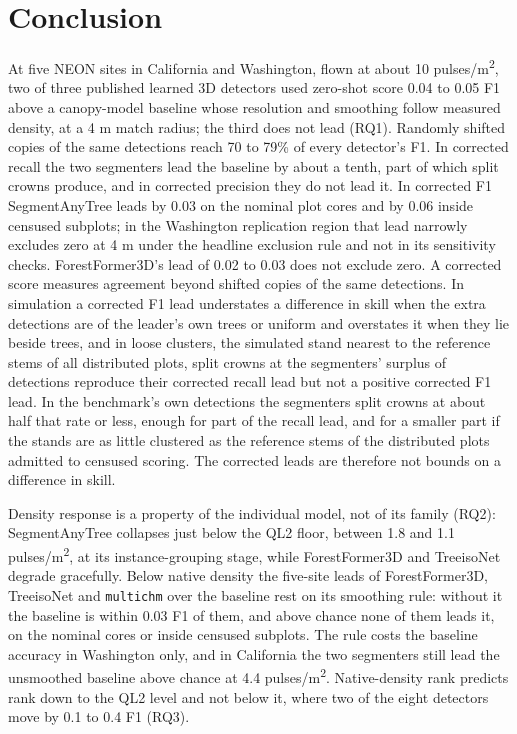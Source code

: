 \documentclass[preprint,12pt,authoryear,a4paper]{elsarticle}
\begin{document}
\section{Conclusion}\label{sec:7}

At five NEON sites in California and Washington, flown at about 10 pulses/m\textsuperscript{2},
two of three published learned 3D detectors used zero-shot score 0.04 to 0.05 F1
above a canopy-model baseline whose resolution and smoothing follow measured
density, at a 4 m match radius; the third does not lead (RQ1). Randomly shifted
copies of the same detections reach 70 to 79\% of every detector's F1. In
corrected recall the two segmenters lead the baseline by about a tenth, part of
which split crowns produce, and in corrected precision they do not lead it. In
corrected F1 SegmentAnyTree leads by 0.03 on the nominal plot cores and by 0.06
inside censused subplots; in the Washington replication region that lead
narrowly excludes zero at 4 m under the headline exclusion rule and not in its
sensitivity checks. ForestFormer3D's lead of 0.02 to 0.03 does not exclude zero.
A corrected score measures agreement beyond shifted copies of the same
detections. In simulation a corrected F1 lead understates a difference in skill
when the extra detections are of the leader's own trees or uniform and
overstates it when they lie beside trees, and in loose clusters, the simulated
stand nearest to the reference stems of all distributed plots, split crowns at
the segmenters' surplus of detections reproduce their corrected recall lead but
not a positive corrected F1 lead. In the benchmark's own detections the
segmenters split crowns at about half that rate or less, enough for part of the
recall lead, and for a smaller part if the stands are as little clustered as the
reference stems of the distributed plots admitted to censused scoring. The
corrected leads are therefore not bounds on a difference in skill.

Density response is a property of the individual model, not of its family (RQ2):
SegmentAnyTree collapses just below the QL2 floor, between 1.8 and 1.1
pulses/m\textsuperscript{2}, at its instance-grouping stage, while ForestFormer3D and TreeisoNet
degrade gracefully. Below native density the five-site leads of ForestFormer3D,
TreeisoNet and \texttt{multichm} over the baseline rest on its smoothing rule: without
it the baseline is within 0.03 F1 of them, and above chance none of them leads
it, on the nominal cores or inside censused subplots. The rule costs the
baseline accuracy in Washington only, and in California the two segmenters still
lead the unsmoothed baseline above chance at 4.4 pulses/m\textsuperscript{2}. Native-density rank
predicts rank down to the QL2 level and not below it, where two of the eight
detectors move by 0.1 to 0.4 F1 (RQ3).
\end{document}
